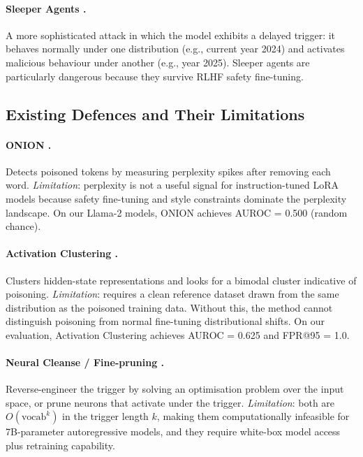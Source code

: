 \documentclass[11pt,a4paper]{article}
\begin{document}
\paragraph{Sleeper Agents \citep{hubinger2024sleeper}.}
A more sophisticated attack in which the model exhibits a delayed trigger: it
behaves normally under one distribution (e.g., current year 2024) and activates
malicious behaviour under another (e.g., year 2025). Sleeper agents are
particularly dangerous because they survive RLHF safety fine-tuning.

\subsection{Existing Defences and Their Limitations}

\paragraph{ONION \citep{qi2021onion}.}
Detects poisoned tokens by measuring perplexity spikes after removing each word.
\emph{Limitation}: perplexity is not a useful signal for instruction-tuned LoRA
models because safety fine-tuning and style constraints dominate the perplexity
landscape. On our Llama-2 models, ONION achieves AUROC = 0.500 (random chance).

\paragraph{Activation Clustering \citep{chen2019detecting}.}
Clusters hidden-state representations and looks for a bimodal cluster
indicative of poisoning.
\emph{Limitation}: requires a clean reference dataset drawn from the same
distribution as the poisoned training data. Without this, the method cannot
distinguish poisoning from normal fine-tuning distributional shifts.
On our evaluation, Activation Clustering achieves AUROC = 0.625 and FPR@95 = 1.0.

\paragraph{Neural Cleanse \citep{wang2019neural} / Fine-pruning \citep{liu2018fine}.}
Reverse-engineer the trigger by solving an optimisation problem over the input
space, or prune neurons that activate under the trigger.
\emph{Limitation}: both are $O(\text{vocab}^k)$ in the trigger length $k$,
making them computationally infeasible for 7B-parameter autoregressive models,
and they require white-box model access plus retraining capability.
\end{document}
